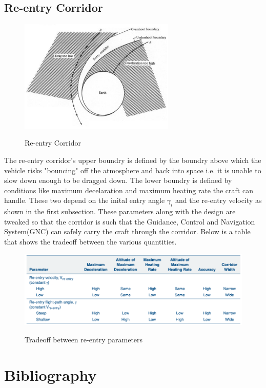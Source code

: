 \documentclass[12pt, letterpaper]{article}
\begin{document}
\subsection{Re-entry Corridor}
\begin{figure}[ht]
	\centering
    \includegraphics[width = 280px]{corridor}
    \label{fig:corridor}
    \caption{Re-entry Corridor}
\end{figure}

The re-entry corridor's upper boundry is defined by the boundry above which the vehicle risks "bouncing" off the atmosphere and back into space i.e. it is unable to slow down enough to be dragged down. The lower boundry is defined by conditions like maximum decelaration and maximum heating rate the craft can handle. These two depend on the inital entry angle $\gamma_i$ and the re-entry velocity as shown in the first subsection. These parameters along with the design are tweaked so that the corridor is such that the Guidance, Control and Navigation System(GNC) can safely carry the craft through the corridor. Below is a table that shows the tradeoff between the various quantities.

\begin{figure}[ht]
	\centering
    \includegraphics[width=\textwidth]{tradeoff}
    \label{fig:tradeoff}
    \caption{Tradeoff between re-entry parameters}
\end{figure}


\newpage

\section{Bibliography}

\end{document}
